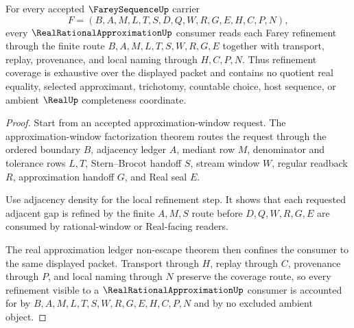 \begin{theorem}
\label{thm:farey-sequence-refinement-coverage}
For every accepted $\FareySequenceUp$ carrier
$$
F=(B,A,M,L,T,S,D,Q,W,R,G,E,H,C,P,N),
$$
every $\RealRationalApproximationUp$ consumer reads each Farey refinement through the finite route $B,A,M,L,T,S,W,R,G,E$ together with transport, replay, provenance, and local naming through $H,C,P,N$. Thus refinement coverage is exhaustive over the displayed packet and contains no quotient real equality, selected approximant, trichotomy, countable choice, host sequence, or ambient $\RealUp$ completeness coordinate.
\end{theorem}
\begin{proof}
Start from an accepted approximation-window request. The approximation-window factorization theorem routes the request through the ordered boundary $B$, adjacency ledger $A$, mediant row $M$, denominator and tolerance rows $L,T$, Stern--Brocot handoff $S$, stream window $W$, regular readback $R$, approximation handoff $G$, and Real seal $E$.

Use adjacency density for the local refinement step. It shows that each requested adjacent gap is refined by the finite $A,M,S$ route before $D,Q,W,R,G,E$ are consumed by rational-window or Real-facing readers.

The real approximation ledger non-escape theorem then confines the consumer to the same displayed packet. Transport through $H$, replay through $C$, provenance through $P$, and local naming through $N$ preserve the coverage route, so every refinement visible to a $\RealRationalApproximationUp$ consumer is accounted for by $B,A,M,L,T,S,W,R,G,E,H,C,P,N$ and by no excluded ambient object.
\end{proof}

